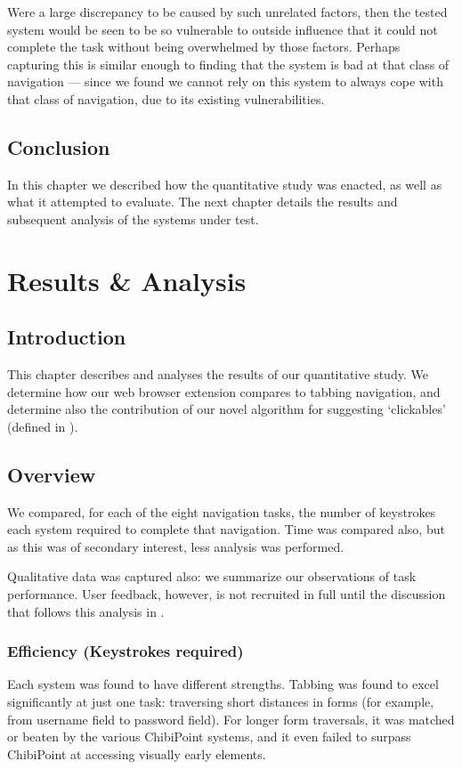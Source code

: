 \documentclass[11pt,openright,a4paper]{report}
\begin{document}
Were a large discrepancy to be caused by such unrelated factors, then the tested system would be seen to be so vulnerable to outside influence that it could not complete the task without being overwhelmed by those factors. Perhaps capturing this is similar enough to finding that the system is bad at that class of navigation --- since we found we cannot rely on this system to always cope with that class of navigation, due to its existing vulnerabilities.

\section{Conclusion}
In this chapter we described how the quantitative study was enacted, as well as what it attempted to evaluate. The next chapter details the results and subsequent analysis of the systems under test.

\chapter{Results \& Analysis}
\label{chap:results}
\section{Introduction}
This chapter describes and analyses the results of our quantitative study. We determine how our web browser extension compares to tabbing navigation, and determine also the contribution of our novel algorithm for suggesting `clickables' (defined in ).
\section{Overview}
We compared, for each of the eight navigation tasks, the number of keystrokes each system required to complete that navigation. Time was compared also, but as this was of secondary interest, less analysis was performed.

Qualitative data was captured also: we summarize our observations of task performance. User feedback, however, is not recruited in full until the discussion that follows this analysis in .
\subsection{Efficiency (Keystrokes required)}
Each system was found to have different strengths. Tabbing was found to excel significantly at just one task: traversing short distances in forms (for example, from username field to password field). For longer form traversals, it was matched or beaten by the various ChibiPoint systems, and it even failed to surpass ChibiPoint at accessing visually early elements.
\end{document}
